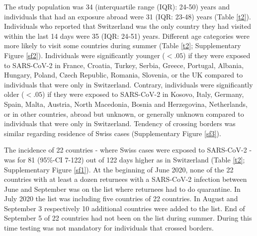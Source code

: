 \documentclass[10pt, a4paper, twoside]{article}
\begin{document}
\begin{multicols}{2}

The study population was 34 (interquartile range (IQR): 24-50) years and individuals that had an exposure abroad were 31 (IQR: 23-48) years (Table \ref{t2}).
Individuals who reported that Switzerland was the only country they had visited within the last 14 days were 35 (IQR: 24-51) years.
Different age categories were more likely to visit some countries during summer (Table \ref{t2}; Supplementary Figure \ref{sf2}).
Individuals were significantly younger ($<.05$) if they were exposed to SARS-CoV-2 in France, Croatia, Turkey, Serbia, Greece, Portugal, Albania, Hungary, Poland, Czech Republic, Romania, Slovenia, or the UK compared to individuals that were only in Switzerland.%
Contrary, individuals were significantly older ($<.05$) if they were exposed to SARS-CoV-2 in Kosovo, Italy, Germany, Spain, Malta, Austria, North Macedonia, Bosnia and Herzegovina, Netherlands, or in other countries, abroad but unknown, or generally unknown compared to individuals that were only in Switzerland.
Tendency of crossing borders was similar regarding residence of Swiss cases (Supplementary Figure \ref{sf3}).

The incidence of 22 countries - where Swiss cases were exposed to SARS-CoV-2 - was for 81 (95\%-CI 7-122) out of 122 days higher as in Switzerland (Table \ref{t2}; Supplementary Figure \ref{sf1}).
At the beginning of June 2020, none of the 22 countries with at least a dozen returnees with a SARS-CoV-2 infection between June and September was on the list where returnees had to do quarantine.
In July 2020 the list was including five countries of 22 countries.
In August and September 3 respectively 10 additional countries were added to the list.
End of September 5 of 22 countries had not been on the list during summer.
During this time testing was not mandatory for individuals that crossed borders.



\end{multicols}
\end{document}

